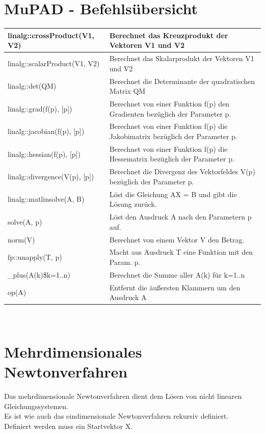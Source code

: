 \documentclass[11pt,final]{scrreprt}
\begin{document}
\newpage
\section{MuPAD - Befehlsübersicht}

\begin{tabular}{|p{5cm}|p{10cm}|}
\hline 
linalg::crossProduct(V1, V2) & Berechnet das Kreuzprodukt der Vektoren V1 und V2 \\ 
\hline 
linalg::scalarProduct(V1, V2) & Berechnet das Skalarprodukt der Vektoren V1 und V2 \\ 
\hline 
linalg::det(QM) & Berechnet die Determinante der quadratischen Matrix QM \\ 
\hline 
linalg::grad(f(p), [p]) & Berechnet von einer Funktion f(p) den Gradienten bezüglich der Parameter p. \\ 
\hline 
linalg::jacobian(f(p), [p]) & Berechnet von einer Funktion f(p) die Jakobimatrix bezüglich der Parameter p. \\ 
\hline 
linalg::hessian(f(p), [p]) & Berechnet von einer Funktion f(p) die Hessematrix bezüglich der Parameter p. \\ 
\hline 
linalg::divergence(V(p), [p]) & Berechnet die Divergenz des Vektorfeldes V(p) bezüglich der Parameter p. \\
\hline 
linalg::matlinsolve(A, B) & Löst die Gleichung AX = B und gibt die Lösung zurück. \\
\hline 
solve({A}, {p}) & Löst den Ausdruck A nach den Parametern p auf. \\
\hline 
norm(V) & Berechnet von einem Vektor V den Betrag. \\ 
\hline 
fp::unapply(T, p) & Macht aus Ausdruck T eine Funktion mit den Param. p. \\
\hline 
\_plus(A(k)\$k=1..n) & Berechnet die Summe aller A(k) für k=1..n \\
\hline 
op(A) & Entfernt die äußersten Klammern um den Ausdruck A \\
\hline 
\end{tabular}\\ 

\section{Mehrdimensionales Newtonverfahren}

Das mehrdimensionale Newtonverfahren dient dem Lösen von nicht linearen Gleichungssystemen.\\
Es ist wie auch das eindimensionale Newtonverfahren rekursiv definiert.\\
Definiert werden muss ein Startvektor X.\\
\end{document}
